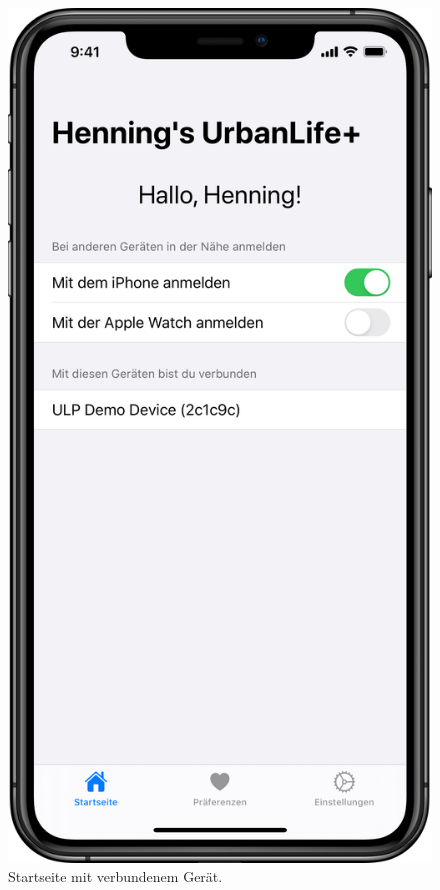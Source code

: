 \begin{minipage}{.45\textwidth}
	\begin{figure}[H]
		\centering
		\includegraphics[width=.68\textwidth]{./images/prototype/ios/homeConnected.png}
		\caption{\label{fig:app:ios:homeConnected}Startseite mit verbundenem Gerät.}
	\end{figure}
\end{minipage}

